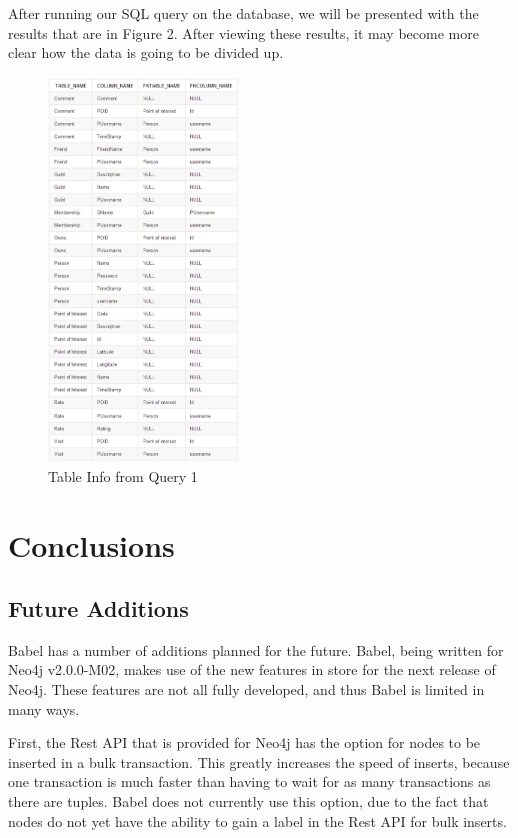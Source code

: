 \documentclass{acm_proc_article-sp}
\begin{document}
After running our SQL query on the database, we will be presented with the results that are in Figure 2. After viewing these results, it may become more clear how the data is going to be divided up. 

\begin{figure}
  \caption{Table Info from Query 1}
  \centering
    \includegraphics[width=0.45\textwidth]{Images/TableInfo}
\end{figure}

\section{Conclusions}

\subsection{Future Additions}

Babel has a number of additions planned for the future. Babel, being written for Neo4j v2.0.0-M02, makes use of the new features in store for the next release of Neo4j. These features are not all fully developed, and thus Babel is limited in many ways.

First, the Rest API that is provided for Neo4j has the option for nodes to be inserted in a bulk transaction. This greatly increases the speed of inserts, because one transaction is much faster than having to wait for as many transactions as there are tuples. Babel does not currently use this option, due to the fact that nodes do not yet have the ability to gain a label in the Rest API for bulk inserts.
\end{document}
